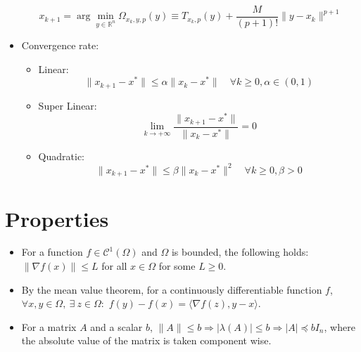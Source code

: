 \documentclass[12pt, openany]{report}
\newcommand{\R}{\mathbb{R}}
\newcommand{\C}{\mathcal{C}}
\theoremstyle{definition}
\begin{document}
\begin{itemize}
	\begin{equation}
		x_{k+1} = \arg\min_{y\in \R^n} \Omega_{x_k,y,p}(y) \equiv T_{x_k,p}(y) + \frac{M}{(p+1)!}\|y-x_k\|^{p+1}
	\end{equation}
	\item Convergence rate: 
	\begin{itemize}
		\item Linear:
		\begin{equation}\label{eq:linear_convergence_rate}
			\|x_{k+1}-x^*\| \leq \alpha \|x_k-x^*\| \quad \forall k\geq 0, \alpha \in (0,1)
		\end{equation}
		\item Super Linear:
		\begin{equation}\label{eq:super_linear_convergence_rate}
			\lim_{k \to +\infty} \frac{\|x_{k+1}-x^*\|}{\|x_k-x^*\|} = 0
		\end{equation}
		\item Quadratic:
		\begin{equation}\label{eq:quadratic_convergence_rate}
			\|x_{k+1}-x^*\| \leq \beta \|x_k-x^*\|^2 \quad \forall k\geq 0, \beta > 0
		\end{equation}
	\end{itemize}
\end{itemize}
\section{Properties}
\begin{itemize}
	\item For a function $f\in \C^1(\Omega)$ and $\Omega$ is bounded, the following holds: $\lVert \nabla f(x)\rVert \le L$ for all $x\in \Omega$ for some $L\ge 0$.
	\item By the mean value theorem, for a continuously differentiable function $f$, $\forall x,y\in \Omega,\: \exists \ z\in \Omega:$ $f(y)-f(x) = \langle \nabla f(z),y-x\rangle$.
	\item For a matrix $A$ and a scalar $b$, $\lVert A\rVert \le b\Longrightarrow |\lambda (A)|\le b \Longrightarrow |A| \preceq bI_n$, where the absolute value of the matrix is taken component wise. 
\end{itemize}
\end{document}
